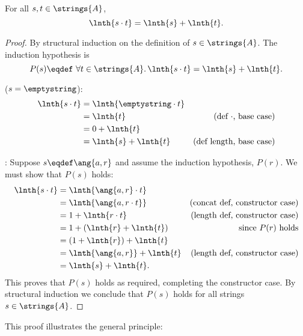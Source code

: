 \begin{theorem}\label{stAl+}
For all $s,t \in \strings{A}$,
\[
\lnth{s\cdot t} = \lnth{s} + \lnth{t}.
\]
\begin{proof}
By structural induction on the definition of $s \in \strings{A}$.   The
induction hypothesis is
\[
P(s) \eqdef\ \forall t \in \strings{A}.\, \lnth{s\cdot t} = \lnth{s} + \lnth{t}.
\]

 ($s = \emptystring$):
\begin{align*}
\lnth{s \cdot t}
   &= \lnth{\emptystring \cdot t}\\
   & = \lnth{t}
         & \text{(def $\cdot$, base case)}\\
   & = 0 + \lnth{t}\\
   & = \lnth{s} + \lnth{t}
         & \text{(def length, base case)}
\end{align*}

: Suppose $s \eqdef \ang{a,r}$ and assume the induction hypothesis, $P(r)$.  We must show that $P(s)$ holds:
\begin{align*}
\lnth{s \cdot t}
    & = \lnth{\ang{a, r} \cdot t}\\
    & = \lnth{\ang{a,r \cdot t}}
        &  \text{(concat def, constructor case)}\\
    & = 1 + \lnth{r \cdot t}
        &  \text{(length def, constructor case)}\\
    & = 1 +  (\lnth{r} + \lnth{t})
        & \text{since $P(r)$ holds}\\
    & = (1 +  \lnth{r}) + \lnth{t}\\
    & = \lnth{\ang{a,r}} + \lnth{t}
        & \text{(length def, constructor case)}\\
    & = \lnth{s} + \lnth{t}.
\end{align*}
This proves that $P(s)$ holds as required, completing the constructor
case.  By structural induction we conclude that $P(s)$ holds for all
strings $s \in \strings{A}$.
\end{proof}

\end{theorem}

This proof illustrates the general principle:


